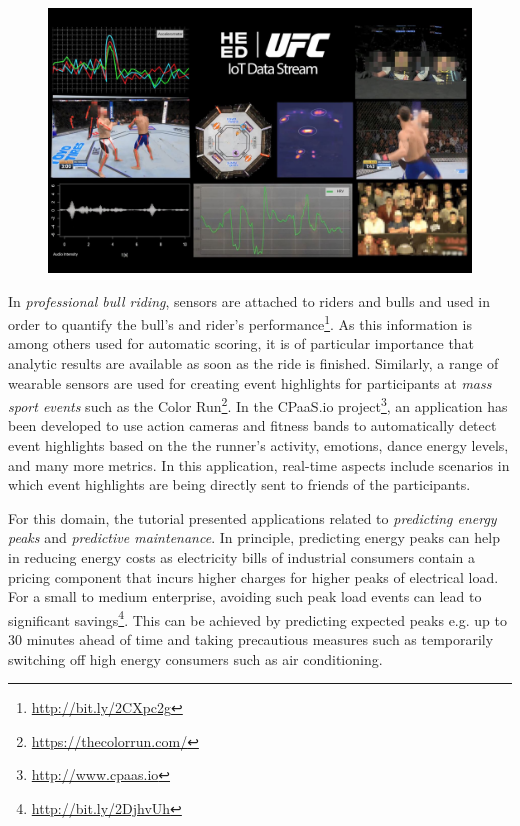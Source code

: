 \begin{figure}[t]
\centering
\includegraphics[scale=0.142]{pictures/DP6L8S9XkAYFMCw.jpg}
\label{FIG:FightStreams}
\end{figure}

In \emph{professional bull riding}, sensors are attached to riders and bulls and used in order to quantify the bull's and rider's performance\footnote{\url{http://bit.ly/2CXpc2g}}. As this information is among others used for automatic scoring, it is of particular importance that analytic results are available as soon as the ride is finished. Similarly, a range of wearable sensors are used for creating event highlights for participants at \emph{mass sport events} such as the Color Run\footnote{\url{https://thecolorrun.com/}}. In the \textsf{CPaaS.io} project\footnote{\url{http://www.cpaas.io}}, an application has been developed to use action cameras and fitness bands to automatically detect event highlights based on the the runner's activity, emotions, dance energy levels, and many more metrics. In this application, real-time aspects include scenarios in which event highlights are being directly sent to friends of the participants.

For this domain, the tutorial presented applications related to \emph{predicting energy peaks} and \emph{predictive maintenance}. In principle, predicting energy peaks can help in reducing energy costs as electricity bills of industrial consumers contain a pricing component that incurs higher charges for higher peaks of electrical load. For a small to medium enterprise, avoiding such peak load events can lead to significant savings\footnote{\url{http://bit.ly/2DjhvUh}}. This can be achieved by predicting expected peaks e.g. up to 30 minutes ahead of time and taking precautious measures such as temporarily switching off high energy consumers such as air conditioning.


